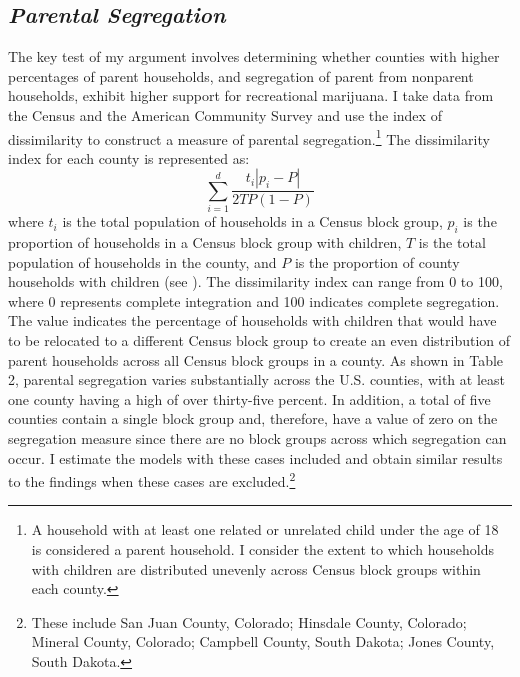 \subsection{\it{Parental Segregation}}

The key test of my argument involves determining whether counties with higher percentages of parent households, and segregation of parent from nonparent households, exhibit higher support for recreational marijuana. I take data from the Census and the American Community Survey and use the index of dissimilarity to construct a measure of parental segregation.\footnote{A household with at least one related or unrelated child under the age of 18 is considered a parent household. I consider the extent to which households with children are distributed unevenly across Census block groups within each county.} The dissimilarity index for each county is represented as:
\begin{equation}
\sum_{i = 1}^{d} \frac{t_{i} \left| p_{i}-P \right|}{2TP (1-P)}
\end{equation}
where $t_{i}$ is the total population of households in a Census block group, $p_{i}$ is the proportion of households in a Census block group with children, $T$ is the total population of households in the county, and $P$ is the proportion of county households with children (see \citealt{massey_and_denton_1988}). The dissimilarity index can range from 0 to 100, where 0 represents complete integration and 100 indicates complete segregation. The value indicates the percentage of households with children that would have to be relocated to a different Census block group to create an even distribution of parent households across all Census block groups in a county. %
As shown in Table 2, parental segregation varies substantially across the U.S. counties, with at least one county having a high of over thirty-five percent. In addition, a total of five counties contain a single block group and, therefore, have a value of zero on the segregation measure since there are no block groups across which segregation can occur. I estimate the models with these cases included and obtain similar results to the findings when these cases are excluded.\footnote{These include San Juan County, Colorado; Hinsdale County, Colorado; Mineral County, Colorado; Campbell County, South Dakota; Jones County, South Dakota.}


